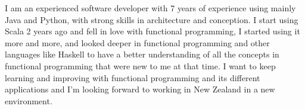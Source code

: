

\begin{cvparagraph}

I am an experienced software developer with 7 years of experience using mainly Java and Python, with strong skills in architecture and conception.
I start using Scala 2 years ago and fell in love with functional programming, I started using it more and more, and looked deeper in functional programming and other languages like Haskell to have a better understanding of all the concepts in functional programming that were new to me at that time.
I want to keep learning and improving with functional programming and its different applications and I'm looking forward to working in New Zealand in a new environment.

\end{cvparagraph}
